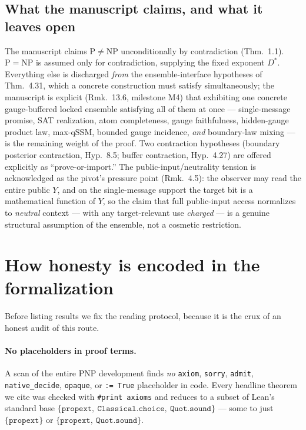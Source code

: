 \documentclass[11pt]{article}
\theoremstyle{definition}
\begin{document}
\subsection{What the manuscript claims, and what it leaves open}
The manuscript claims $\mathrm{P}\neq\mathrm{NP}$ unconditionally by contradiction
(Thm.~1.1). $\mathrm{P}=\mathrm{NP}$ is assumed only for contradiction, supplying
the fixed exponent $D^\ast$. Everything else is discharged \emph{from} the
ensemble-interface hypotheses of Thm.~4.31, which a concrete construction must
satisfy simultaneously; the manuscript is explicit (Rmk.~13.6, milestone M4) that
exhibiting one concrete gauge-buffered locked ensemble satisfying all of them at
once --- single-message promise, SAT realization, atom completeness, gauge
faithfulness, hidden-gauge product law, max-qSSM, bounded gauge incidence,
\emph{and} boundary-law mixing --- is the remaining weight of the proof. Two
contraction hypotheses (boundary posterior contraction, Hyp.~8.5; buffer
contraction, Hyp.~4.27) are offered explicitly as ``prove-or-import.'' The
public-input/neutrality tension is acknowledged as the pivot's pressure point
(Rmk.~4.5): the observer may read the entire public $Y$, and on the single-message
support the target bit is a mathematical function of $Y$, so the claim that
full public-input access normalizes to \emph{neutral} context --- with any
target-relevant use \emph{charged} --- is a genuine structural assumption of the
ensemble, not a cosmetic restriction.

\section{How honesty is encoded in the formalization}
\label{sec:honesty}

Before listing results we fix the reading protocol, because it is the crux of an
honest audit of this route.

\paragraph{No placeholders in proof terms.} A scan of the entire PNP development
finds \emph{no} \texttt{axiom}, \texttt{sorry}, \texttt{admit},
\texttt{native\_decide}, \texttt{opaque}, or \texttt{:= True} placeholder in code.
Every headline theorem we cite was checked with \texttt{\#print axioms} and
reduces to a subset of Lean's standard base
$\{\texttt{propext},\ \texttt{Classical.choice},\ \texttt{Quot.sound}\}$ --- some
to just $\{\texttt{propext}\}$ or $\{\texttt{propext},\ \texttt{Quot.sound}\}$.
\end{document}
